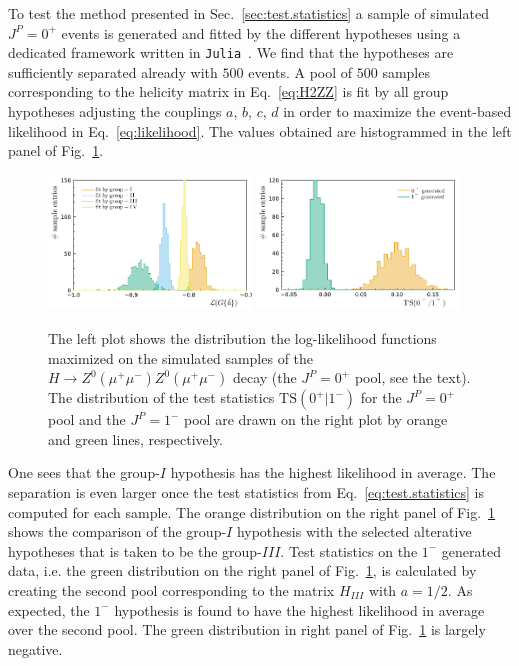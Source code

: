 \documentclass[prd,preprintnumbers,floatfix,
nofootinbib,superscriptaddress]{revtex4}
\newcommand{\TS}{\mathrm{TS}}
\newcommand{\I}{\ensuremath{I}}
\newcommand{\III}{\ensuremath{{I\!I\!I}}}
\begin{document}
To test the method presented in Sec.~\ref{sec:test.statistics} a sample of simulated $J^P=0^+$ events
is generated and fitted by the different hypotheses using a dedicated framework written in \texttt{Julia}~\cite{julia.JpsiJpsi}.
We find that the hypotheses are sufficiently separated already with $500$ events. %
A pool of $500$ samples corresponding to the helicity matrix in Eq.~\eqref{eq:H2ZZ} is fit by all group hypotheses adjusting the couplings $a$, $b$, $c$, $d$ in order to maximize the event-based likelihood in Eq.~\eqref{eq:likelihood}.
The values obtained are histogrammed in the left panel of Fig.~\ref{fig:TS.fixedH}.
\begin{figure}
  \includegraphics[width=0.48\textwidth]{llh_testing_higgs.pdf}
  \includegraphics[width=0.48\textwidth]{TS_0p_vs_1m.pdf}
  \caption{The left plot shows the distribution the
  log-likelihood functions maximized on the simulated samples of the $H\to Z^0(\mu^+\mu^-)Z^0(\mu^+\mu^-)$ decay (the $J^P=0^+$ pool, see the text).
  The distribution of the test statistics $\TS(0^+|1^-)$ for the $J^P=0^+$ pool and the $J^P=1^-$ pool are drawn on the right plot by orange and green lines, respectively.}
  \label{fig:TS.fixedH}
\end{figure}
One sees that the group-$\I$ hypothesis has the highest likelihood in average.
The separation is even larger once the test statistics from Eq.~\eqref{eq:test.statistics} is computed for each sample.
The orange distribution on the right panel of Fig.~\ref{fig:TS.fixedH} shows the comparison of the group-$\I$ hypothesis with the selected alterative hypotheses that is taken to be the group-$\III$.
Test statistics on the $1^-$ generated data, i.e. the green distribution on the right panel of Fig.~\ref{fig:TS.fixedH}, is calculated by creating the second pool corresponding to the matrix $H_\III$ with $a = 1/2$.
As expected, the $1^-$ hypothesis is found to have the highest likelihood in average over the second pool. The green distribution in right panel of Fig.~\ref{fig:TS.fixedH} is largely negative.
\end{document}
